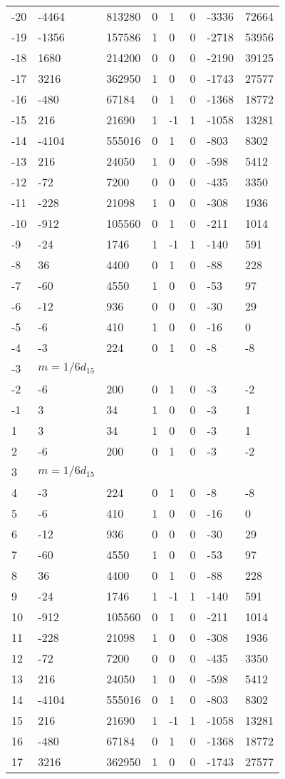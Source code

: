 \documentclass{amsart}
\begin{document}
\begin{longtable}{|l|l|l|lllll|}
-20&-4464&813280&0&1&0&-3336&72664\\
-19&-1356&157586&1&0&0&-2718&53956\\
-18&1680&214200&0&0&0&-2190&39125\\
-17&3216&362950&1&0&0&-1743&27577\\
-16&-480&67184&0&1&0&-1368&18772\\
-15&216&21690&1&-1&1&-1058&13281\\
-14&-4104&555016&0&1&0&-803&8302\\
-13&216&24050&1&0&0&-598&5412\\
-12&-72&7200&0&0&0&-435&3350\\
-11&-228&21098&1&0&0&-308&1936\\
-10&-912&105560&0&1&0&-211&1014\\
-9&-24&1746&1&-1&1&-140&591\\
-8&36&4400&0&1&0&-88&228\\
-7&-60&4550&1&0&0&-53&97\\
-6&-12&936&0&0&0&-30&29\\
-5&-6&410&1&0&0&-16&0\\
-4&-3&224&0&1&0&-8&-8\\
-3&$m=1/6d_{15}$&&\multicolumn{5}{c|}{}\\
-2&-6&200&0&1&0&-3&-2\\
-1&3&34&1&0&0&-3&1\\
1&3&34&1&0&0&-3&1\\
2&-6&200&0&1&0&-3&-2\\
3&$m=1/6d_{15}$&&\multicolumn{5}{c|}{}\\
4&-3&224&0&1&0&-8&-8\\
5&-6&410&1&0&0&-16&0\\
6&-12&936&0&0&0&-30&29\\
7&-60&4550&1&0&0&-53&97\\
8&36&4400&0&1&0&-88&228\\
9&-24&1746&1&-1&1&-140&591\\
10&-912&105560&0&1&0&-211&1014\\
11&-228&21098&1&0&0&-308&1936\\
12&-72&7200&0&0&0&-435&3350\\
13&216&24050&1&0&0&-598&5412\\
14&-4104&555016&0&1&0&-803&8302\\
15&216&21690&1&-1&1&-1058&13281\\
16&-480&67184&0&1&0&-1368&18772\\
17&3216&362950&1&0&0&-1743&27577\\

\end{longtable}
\end{document}
